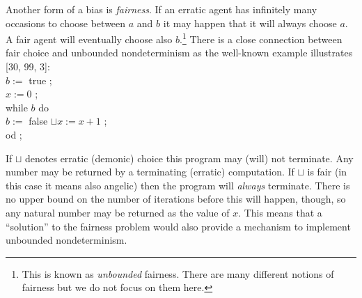 \documentclass[10pt]{article}
\begin{document}
 Another form of a bias is {\em fairness}. If an 
erratic agent has infinitely many occasions to choose between $a$
and $b$ it may happen that it will always choose $a$. A fair 
agent will eventually choose also $b$.\footnote{ 
This is known as {\em unbounded} fairness. There 
are many different notions of fairness but we do not focus on them 
here.}
 There is a close connection between fair choice and unbounded 
nondeterminism as the well-known example illustrates [30, 99, 3]: 
\\
\hspace*{2em} $b := $ true ; \\
\hspace*{2em} $x := 0$ ; \\
\hspace*{2em}  while $b$ do \\
\hspace*{3em} $b := $ false $\sqcup x := x+1$ ;  \\
\hspace*{2em} od ; 

\noindent
If $\sqcup$ denotes erratic (demonic) choice this program may (will) not 
terminate. Any number may be returned by a terminating (erratic) 
computation. If $\sqcup$ is fair (in this case it means also angelic) then 
the program will {\em always} terminate. There is no upper bound on the 
number of iterations before this will 
happen, though, so any natural number may be returned as the value of 
$x$. This means that a ``solution'' to the fairness problem would 
also provide a mechanism to implement 
unbounded nondeterminism. 
\end{document}
